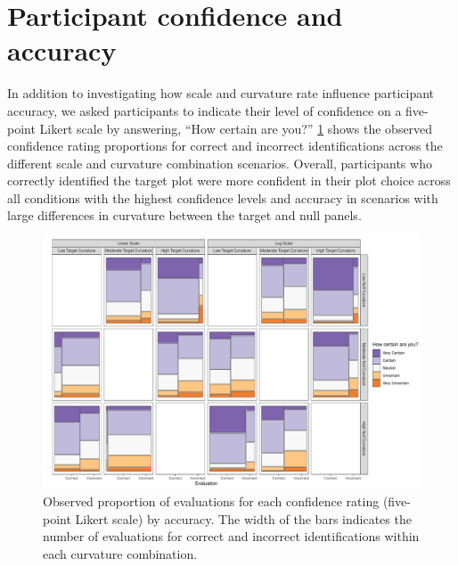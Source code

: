 \documentclass[12pt]{article}
\begin{document}
\renewcommand{\thesection}{C}

\hypertarget{participant-confidence-and-accuracy}{%
\section{Participant confidence and
accuracy}\label{participant-confidence-and-accuracy}}

In addition to investigating how scale and curvature rate influence
participant accuracy, we asked participants to indicate their level of
confidence on a five-point Likert scale by answering, ``How certain are
you?'' \cref{fig:conf-mosaic} shows the observed confidence rating
proportions for correct and incorrect identifications across the
different scale and curvature combination scenarios. Overall,
participants who correctly identified the target plot were more
confident in their plot choice across all conditions with the highest
confidence levels and accuracy in scenarios with large differences in
curvature between the target and null panels.

\begin{figure}[tbp]

{\centering \includegraphics[width=\linewidth,]{appendix_files/figure-latex/conf-mosaic-1} 

}

\caption{Observed proportion of evaluations for each confidence rating (five-point Likert scale) by accuracy. The width of the bars indicates the number of evaluations for correct and incorrect identifications within each curvature combination.}\label{fig:conf-mosaic}
\end{figure}


\renewcommand\refname{References}

\end{document}
